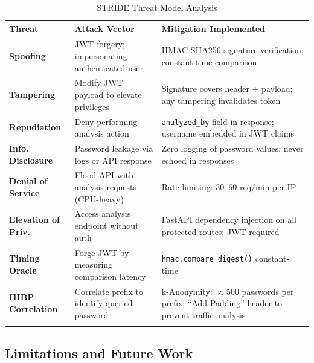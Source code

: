 \documentclass[12pt,a4paper]{article}
\begin{document}
\begin{longtable}{>{\bfseries}p{2.5cm} p{5cm} p{5.5cm}}
\toprule
\textbf{Threat} & \textbf{Attack Vector} & \textbf{Mitigation Implemented} \\
\midrule
\endhead

Spoofing        & JWT forgery; impersonating authenticated user
                & HMAC-SHA256 signature verification;
                  constant-time comparison \\[0.5em]
Tampering       & Modify JWT payload to elevate privileges
                & Signature covers header + payload;
                  any tampering invalidates token \\[0.5em]
Repudiation     & Deny performing analysis action
                & \texttt{analyzed\_by} field in response;
                  username embedded in JWT claims \\[0.5em]
Info. Disclosure & Password leakage via logs or API response
                & Zero logging of password values;
                  never echoed in responses \\[0.5em]
Denial of Service & Flood API with analysis requests (CPU-heavy)
                & Rate limiting: 30--60 req/min per IP \\[0.5em]
Elevation of Priv. & Access analysis endpoint without auth
                & FastAPI dependency injection on all
                  protected routes; JWT required \\[0.5em]
Timing Oracle   & Forge JWT by measuring comparison latency
                & \texttt{hmac.compare\_digest()} constant-time \\[0.5em]
HIBP Correlation & Correlate prefix to identify queried password
                & k-Anonymity: $\approx 500$ passwords per prefix;
                  ``Add-Padding'' header to prevent traffic analysis \\[0.5em]

\bottomrule
\caption{STRIDE Threat Model Analysis}
\end{longtable}

\subsection{Limitations and Future Work}
\end{document}
